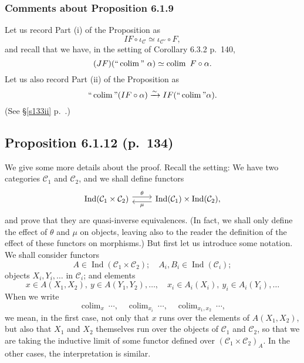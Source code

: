 \documentclass[12pt]{article}%
\theoremstyle{remark}
\theoremstyle{definition}
\newcommand{\C}{\mathcal C}
\DeclareMathOperator*{\colim}{colim}%
\DeclareMathOperator{\Ind}{Ind}
\begin{document}
\subsubsection{Comments about Proposition 6.1.9} 

Let us record Part (i) of the Proposition as 
\begin{equation}\label{133i}
IF\circ\iota_\C\simeq\iota_{\C'}\circ F, 
\end{equation} 
and recall that we have, in the setting of Corollary 6.3.2 p.~140, 
\begin{equation}\label{140}
(JF)(``\colim"\ \alpha)\simeq\colim\ F\circ\alpha.
\end{equation}
Let us also record Part (ii) of the Proposition as 
\begin{equation}\label{133ii}
``\colim"(IF\circ\alpha)\xrightarrow\sim IF(``\colim"\alpha).
\end{equation} 
(See \S\ref{s133ii} p.~\pageref{s133ii}.)


\subsection{Proposition 6.1.12 (p.~134)}\label{6112}

We give some more details about the proof. Recall the setting: We have two categories $\C_1$ and $\C_2$, and we shall define functors
$$
\begin{tikzcd}
\Ind(\C_1\times\C_2)\ar[yshift=0.7ex]{r}{\theta}&\Ind(\C_1)\times\Ind(\C_2),\ar[yshift=-0.7ex]{l}{\mu}
\end{tikzcd}
$$ 
and prove that they are quasi-inverse equivalences. (In fact, we shall only define the effect of $\theta$ and $\mu$ on objects, leaving also to the reader the definition of the effect of these functors on morphisms.) But first let us introduce some notation. We shall consider functors 
$$
A\in\Ind(\C_1\times\C_2);\quad A_i,B_i\in\Ind(\C_i);
$$ 
objects $X_i,Y_i,\dots$ in $\C_i$; and elements 
$$
x\in A(X_1,X_2),\ y\in A(Y_1,Y_2),\dots,\quad x_i\in A_i(X_i),\ y_i\in A_i(Y_i),\dots
$$ 
When we write 
$$
\colim_x\ \cdots,\quad\colim_{x_i}\ \cdots,\quad\colim_{x_1,x_2}\ \cdots,
$$ 
we mean, in the first case, not only that $x$ runs over the elements of $A(X_1,X_2)$, but also that $X_1$ and $X_2$ themselves run over the objects of $\C_1$ and $\C_2$, so that we are taking the inductive limit of some functor defined over $(\C_1\times\C_2)_A$. In the other cases, the interpretation is similar. 
\end{document}
